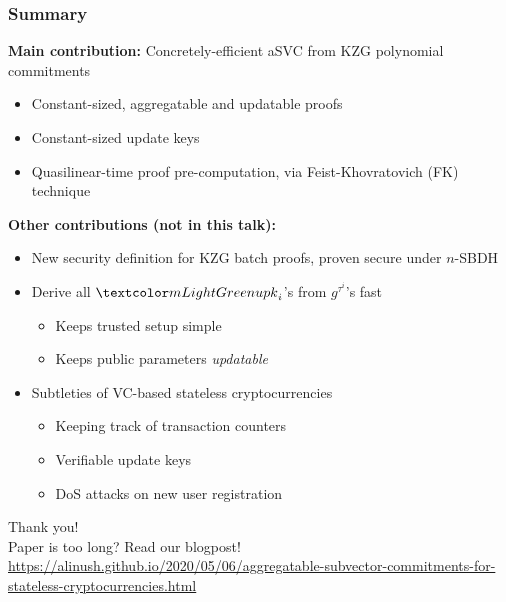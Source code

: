\begin{frame}
    \frametitle{Summary}

    \small
    \pause
    \textbf{Main contribution:} \alert{Concretely-efficient} aSVC from KZG polynomial commitments\pause
    \begin{itemize}
        \item Constant-sized, aggregatable and updatable proofs\pause
        \item Constant-sized update keys\pause
        \item Quasilinear-time proof pre-computation, via Feist-Khovratovich (FK) technique~\cite{FK20}\pause
    \end{itemize}

    \textbf{Other contributions (not in this talk):}\pause
    \begin{itemize}
        \item New security definition for KZG batch proofs, proven secure under $n$-SBDH\pause
        \item Derive all $\upk_i$'s from $g^{\tau^i}$'s fast\pause
        \begin{itemize}
            \item Keeps trusted setup simple\pause
            \item Keeps public parameters \textit{updatable}\pause
        \end{itemize}
        \item Subtleties of VC-based stateless cryptocurrencies\pause
        \begin{itemize}
            \item Keeping track of transaction counters\pause
            \item Verifiable update keys\pause
            \item DoS attacks on new user registration
        \end{itemize}
    \end{itemize}
\end{frame}


{
    \begin{frame}[standout]
        Thank you!\\
        \vspace{2em}
        \small
        {\normalfont Paper is too long?}
        Read our blogpost!\\
        \vspace{1em}
        \footnotesize
        \normalfont
        \href{https://alinush.github.io/2020/05/06/aggregatable-subvector-commitments-for-stateless-cryptocurrencies.html}{https://alinush.github.io/2020/05/06/aggregatable-subvector-commitments-for-stateless-cryptocurrencies.html}
    \end{frame}
}